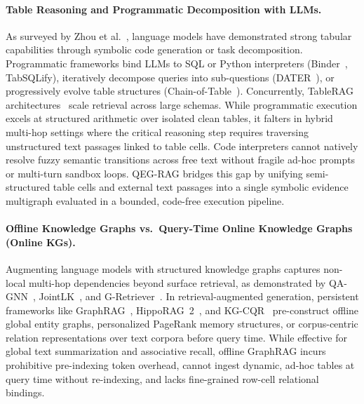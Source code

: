 \documentclass[runningheads]{llncs}
\begin{document}
\paragraph{Table Reasoning and Programmatic Decomposition with LLMs.}
As surveyed by Zhou et al.~\cite{zhou2026tableqasurvey}, language models have demonstrated strong tabular capabilities through symbolic code generation or task decomposition. Programmatic frameworks bind LLMs to SQL or Python interpreters (Binder~\cite{cheng2023binder}, TabSQLify), iteratively decompose queries into sub-questions (DATER~\cite{ye2023dater}), or progressively evolve table structures (Chain-of-Table~\cite{wang2024chainoftable}). Concurrently, TableRAG architectures~\cite{chen2024tablerag,yu2025tablerag} scale retrieval across large schemas. While programmatic execution excels at structured arithmetic over isolated clean tables, it falters in hybrid multi-hop settings where the critical reasoning step requires traversing unstructured text passages linked to table cells. Code interpreters cannot natively resolve fuzzy semantic transitions across free text without fragile ad-hoc prompts or multi-turn sandbox loops. QEG-RAG bridges this gap by unifying semi-structured table cells and external text passages into a single symbolic evidence multigraph evaluated in a bounded, code-free execution pipeline.

\paragraph{Offline Knowledge Graphs vs.\ Query-Time Online Knowledge Graphs (Online KGs).}
Augmenting language models with structured knowledge graphs captures non-local multi-hop dependencies beyond surface retrieval, as demonstrated by QA-GNN~\cite{yasunaga2021qagnn}, JointLK~\cite{sun2022jointlk}, and G-Retriever~\cite{he2024gretriever}. In retrieval-augmented generation, persistent frameworks like GraphRAG~\cite{edge2024graphrag}, HippoRAG~2~\cite{gutierrez2025hipporag2}, and KG-CQR~\cite{bui2025kgcqr} pre-construct offline global entity graphs, personalized PageRank memory structures, or corpus-centric relation representations over text corpora before query time. While effective for global text summarization and associative recall, offline GraphRAG incurs prohibitive pre-indexing token overhead, cannot ingest dynamic, ad-hoc tables at query time without re-indexing, and lacks fine-grained row-cell relational bindings.
\end{document}
